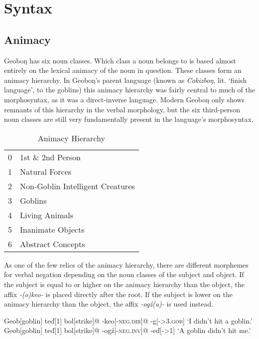 \documentclass[10pt]{article}
\newcommand{\sk}{\textsc}
\newcommand{\vd}{ď}
\newcommand{\engma}{ŋ}
\begin{document}
\section{Syntax}

\subsection{Animacy}

Geobo{\engma} has six noun classes. Which class a noun belongs to is based almost entirely on the lexical animacy of the noun in question. These classes form an animacy hierarchy. In Geobo{\engma}'s parent language (known as \textit{Cokizbo\engma}, lit. `finish language', to the goblins) this animacy hierarchy was fairly central to much of the morphosyntax, as it was a direct-inverse language. Modern Geobo{\engma} only shows remnants of this hierarchy in the verbal morphology, but the six third-person noun classes are still very fundamentally present in the language's morphosyntax.

\begin{table}[h]
    \centering
    \begin{tabular}{@{}rl@{}}
    \toprule
0 & 1st \& 2nd Person \\
1 & Natural Forces \\
2 & Non-Goblin Intelligent Creatures \\
3 & Goblins \\
4 & Living Animals \\
5 & Inanimate Objects \\
6 & Abstract Concepts \\
\bottomrule
\end{tabular}
    \caption{Animacy Hierarchy}
    \label{tab:anim}
\end{table}

As one of the few relics of the animacy hierarchy, there are different morphemes for verbal negation depending on the noun classes of the subject and object. If the subject is equal to or higher on the animacy hierarchy than the object, the affix \textit{-(o)keo-} is placed directly after the root. If the subject is lower on the animacy hierarchy than the object, the affix \textit{-og\'z(u)-} is used instead. 

\pex
\a
\begingl
Geob[goblin] 
te\vd[1]
bol[strike]@
-keo[-\sk{neg.dir}]@
-g[-\sk{>3.gob}]
\glft `I didn't hit a goblin.'
\endgl
\a
\begingl
Geob[goblin] 
te\vd[1]
bol[strike]@
-og\'z[-\sk{neg.inv}]@
-e\vd[-\sk{>1}]
\glft `A goblin didn't hit me.'
\endgl
\xe
\end{document}
